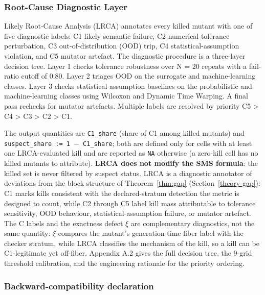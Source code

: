 \documentclass[manuscript,screen,review]{acmart}
\begin{document}
\subsubsection{Root-Cause Diagnostic Layer}\label{lrca-engineering-attribution-layer-descriptive-not-in-sms}

Likely Root-Cause Analysis (LRCA) annotates every killed mutant with one
of five diagnostic labels: C1 likely semantic failure, C2
numerical-tolerance perturbation, C3 out-of-distribution (OOD) trip, C4
statistical-assumption violation, and C5 mutator artefact. The diagnostic
procedure is a three-layer decision tree.
Layer 1 checks tolerance robustness over N = 20 repeats with a
fail-ratio cutoff of 0.80. Layer 2 triages OOD on the surrogate and
machine-learning classes. Layer 3 checks statistical-assumption
baselines on the probabilistic and machine-learning classes using
Wilcoxon and Dynamic Time Warping. A final pass rechecks for mutator
artefacts. Multiple labels are resolved by priority C5 \textgreater{} C4
\textgreater{} C3 \textgreater{} C2 \textgreater{} C1.

The output quantities are \texttt{C1\_share} (share of C1 among killed
mutants) and \texttt{suspect\_share\ :=\ 1\ $-$\ C1\_share}; both are
defined only for cells with at least one LRCA-evaluated kill and are
reported as \texttt{NA} otherwise (a zero-kill cell has no killed
mutants to attribute). \textbf{LRCA
does not modify the SMS formula}: the killed set is never filtered by
suspect status. LRCA is a diagnostic annotator of deviations from the
block structure of Theorem~\ref{thm:gap} (Section~\ref{theory-gap}): C1
marks kills consistent with the declared-stratum detection the metric is
designed to count, while C2 through C5 label kill mass attributable to
tolerance sensitivity, OOD behaviour, statistical-assumption
failure, or mutator artefact. The C labels and the exactness defect
$\xi$ are complementary diagnostics, not the same quantity: $\xi$
compares the mutant's generation-time fiber label with the checker
stratum, while LRCA classifies the mechanism of the kill, so a kill can
be C1-legitimate yet off-fiber. Appendix A.2 gives the full decision tree, the 9-grid
threshold calibration, and the engineering rationale for the priority
ordering.

\subsubsection{Backward-compatibility declaration}\label{backward-compatibility-declaration}
\end{document}
